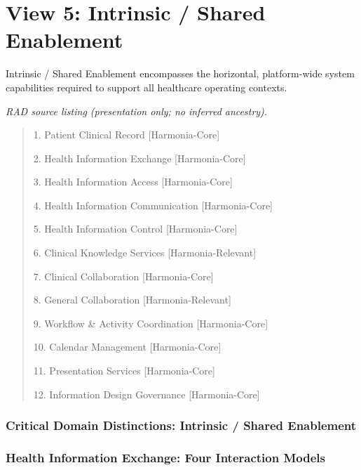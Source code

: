 \par\smallskip
{}\label{rad:enabling:560}
\section*{View 5: Intrinsic /\allowbreak{} Shared Enablement}
\label{rad:enabling:562}

Intrinsic /\allowbreak{} Shared Enablement encompasses the horizontal, platform-wide system capabilities required to support all healthcare operating contexts.

\label{rad:enabling:564}

\textit{RAD source listing (presentation only; no inferred ancestry).}
\begin{quote}
1. Patient Clinical Record [Harmonia-Core]

2. Health Information Exchange [Harmonia-Core]

3. Health Information Access [Harmonia-Core]

4. Health Information Communication [Harmonia-Core]

5. Health Information Control [Harmonia-Core]

6. Clinical Knowledge Services [Harmonia-Relevant]

7. Clinical Collaboration [Harmonia-Core]

8. General Collaboration [Harmonia-Relevant]

9. Workflow \& Activity Coordination [Harmonia-Core]

10. Calendar Management [Harmonia-Core]

11. Presentation Services [Harmonia-Core]

12. Information Design Governance [Harmonia-Core]
\end{quote}
\label{rad:enabling:579}
\subsubsection*{Critical Domain Distinctions: Intrinsic /\allowbreak{} Shared Enablement}
\label{rad:enabling:581}
\subsubsection*{Health Information Exchange: Four Interaction Models}
\label{rad:enabling:582}

